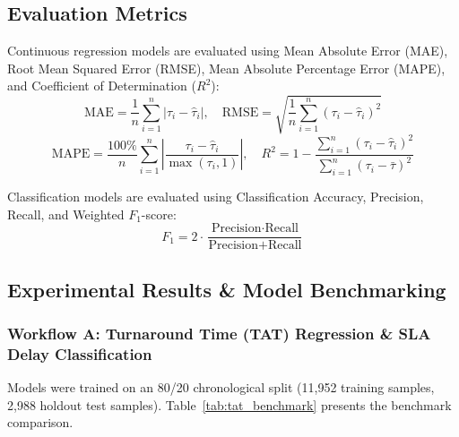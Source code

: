 \documentclass[conference]{IEEEtran}
\begin{document}
\subsection{Evaluation Metrics}
Continuous regression models are evaluated using Mean Absolute Error (MAE), Root Mean Squared Error (RMSE), Mean Absolute Percentage Error (MAPE), and Coefficient of Determination ($R^2$):
\begin{equation}
\text{MAE} = \frac{1}{n} \sum_{i=1}^n |\tau_i - \hat{\tau}_i|, \quad \text{RMSE} = \sqrt{\frac{1}{n} \sum_{i=1}^n (\tau_i - \hat{\tau}_i)^2}
\end{equation}
\begin{equation}
\text{MAPE} = \frac{100\%}{n} \sum_{i=1}^n \left| \frac{\tau_i - \hat{\tau}_i}{\max(\tau_i, 1)} \right|, \quad R^2 = 1 - \frac{\sum_{i=1}^n (\tau_i - \hat{\tau}_i)^2}{\sum_{i=1}^n (\tau_i - \bar{\tau})^2}
\end{equation}

Classification models are evaluated using Classification Accuracy, Precision, Recall, and Weighted $F_1$-score:
\begin{equation}
F_1 = 2 \cdot \frac{\text{Precision} \cdot \text{Recall}}{\text{Precision} + \text{Recall}}
\end{equation}

\subsection{Experimental Results \& Model Benchmarking}

\subsubsection{Workflow A: Turnaround Time (TAT) Regression \& SLA Delay Classification}
Models were trained on an 80/20 chronological split (11,952 training samples, 2,988 holdout test samples). Table~\ref{tab:tat_benchmark} presents the benchmark comparison.
\end{document}
